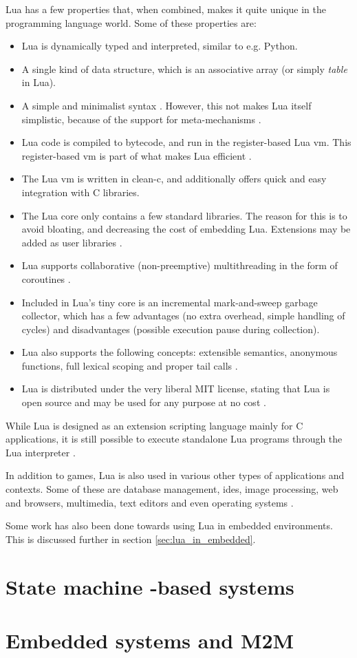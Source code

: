 Lua has a few properties that, when combined, makes it quite unique in the programming language world. Some of these properties are:
\begin{itemize}
	\item Lua is dynamically typed and interpreted, similar to e.g. Python.
	\item A single kind of data structure, which is an associative array (or simply \textit{table} in Lua).
	\item A simple and minimalist syntax \cite[ch. 9]{manual:lua_reference_manual}. However, this not makes Lua itself simplistic, because of the support for meta-mechanisms \cite{manual:lua_reference_manual}.
	\item Lua code is compiled to bytecode, and run in the register-based Lua \gls{vm}. This register-based \gls{vm} is part of what makes Lua efficient \cite{article:the_implementation_of_lua}.
	\item The Lua \gls{vm} is written in \gls{clean-c}, and additionally offers quick and easy integration with C libraries.
	\item The Lua core only contains a few standard libraries. The reason for this is to avoid bloating, and decreasing the cost of embedding Lua. Extensions may be added as user libraries \cite{article:the_implementation_of_lua}.
	\item Lua supports collaborative (non-preemptive) multithreading in the form of coroutines \cite[ch. 2.6]{manual:lua_reference_manual}.
	\item Included in Lua’s tiny core is an incremental mark-and-sweep garbage collector, which has a few advantages (no extra overhead, simple handling of cycles) and disadvantages (possible execution pause during collection).
	\item Lua also supports the following concepts: extensible semantics, anonymous functions, full lexical scoping and proper tail calls \cite{inproceedings:the_evolution_of_lua}.
	\item Lua is distributed under the very liberal MIT license, stating that Lua is open source and may be used for any purpose at no cost \cite{website:lua_license}.
\end{itemize}

While Lua is designed as an extension scripting language mainly for C applications, it is still possible to execute standalone Lua programs through the Lua interpreter \cite[ch. 7]{manual:lua_reference_manual}.

In addition to games, Lua is also used in various other types of applications and contexts. Some of these are database management, \glspl{ide}, image processing, web and browsers, multimedia, text editors and even operating systems \cite{website:where_lua_is_used}.

Some work has also been done towards using Lua in embedded environments. This is discussed further in section \ref{sec:lua_in_embedded}.

\section{State machine -based systems}
\label{sec:state_machine_system}


\section{Embedded systems and M2M}
\label{sec:embedded_m2m}